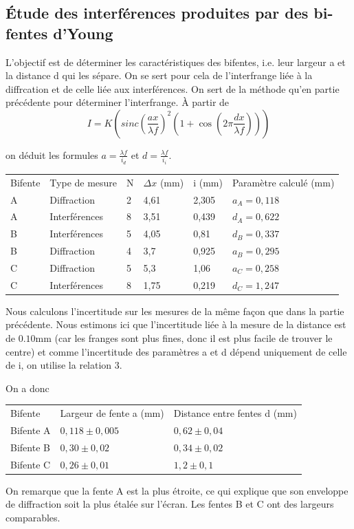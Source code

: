 \documentclass[a4paper,9pt,french]{scrartcl}
\begin{document}
\subsection{Étude des interférences produites par des bi-fentes d'Young}
L'objectif est de déterminer les caractéristiques des bifentes, i.e. leur largeur a et la distance d qui les sépare. On se sert pour cela de l'interfrange liée à la diffrcation et de celle liée aux interférences. On sert de la méthode qu'en partie précédente pour déterminer l'interfrange.
À partir de
\begin{equation}
 I = K(sinc(\frac{ax}{\lambda f})^2(1+\cos(2\pi\frac{dx}{\lambda f})))
\end{equation}

on déduit les formules \(a = \frac{\lambda f}{i_d}\) et \(d = \frac{\lambda f}{i_i}\).
\begin{center}
\begin{tabular}{llllll}
Bifente & Type de mesure & N & \(\Delta x\) (mm) & i (mm) & Paramètre calculé (mm)\\
A & Diffraction & 2 & 4,61 & 2,305 & \(a_A=0,118\)\\
A & Interférences & 8 & 3,51 & 0,439 & \(d_A=0,622\)\\
B & Interférences & 5 & 4,05 & 0,81 & \(d_B=0,337\)\\
B & Diffraction & 4 & 3,7 & 0,925 & \(a_B=0,295\)\\
C & Diffraction & 5 & 5,3 & 1,06 & \(a_C=0,258\)\\
C & Interférences & 8 & 1,75 & 0,219 & \(d_C=1,247\)
\end{tabular}
\end{center}

Nous calculons l'incertitude sur les mesures de la m\^eme façon que dans la partie précédente. Nous estimons ici que l'incertitude liée à la mesure de la distance est de \(0.10\)mm (car les franges sont plus fines, donc il est plus facile de trouver le centre) et comme l'incertitude des paramètres a et d dépend uniquement de celle de i, on utilise la relation 3.

On a donc \begin{center}
\begin{tabular}{lll}
Bifente & Largeur de fente a (mm) & Distance entre fentes d (mm)\\
Bifente A & \(0,118\pm0,005\) & \(0,62\pm0,04\)\\
Bifente B & \(0,30\pm0,02\) & \(0,34\pm0,02\)\\
Bifente C & \(0,26\pm0,01\) & \(1,2\pm0,1\)
          \end{tabular}
          \end{center}
On remarque que la fente A est la plus étroite, ce qui explique que son enveloppe de diffraction soit la plus étalée sur l'écran. Les fentes B et C ont des largeurs comparables.
\end{document}
